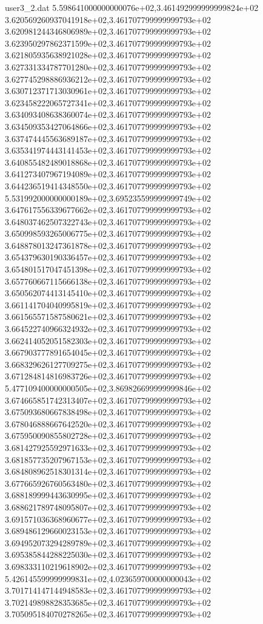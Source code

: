\begin{filecontents}{user3_2.dat}
5.598641000000000076e+02,3.461492999999999824e+02
3.620569260937041918e+02,3.461707799999999793e+02
3.620981244346806989e+02,3.461707799999999793e+02
3.623950297862371599e+02,3.461707799999999793e+02
3.621805935638921028e+02,3.461707799999999793e+02
3.627331334787701280e+02,3.461707799999999793e+02
3.627745298886936212e+02,3.461707799999999793e+02
3.630712371713030961e+02,3.461707799999999793e+02
3.623458222065727341e+02,3.461707799999999793e+02
3.634093408638360074e+02,3.461707799999999793e+02
3.634509353427064866e+02,3.461707799999999793e+02
3.637474445563689187e+02,3.461707799999999793e+02
3.635341974443141453e+02,3.461707799999999793e+02
3.640855482489018868e+02,3.461707799999999793e+02
3.641273407967194089e+02,3.461707799999999793e+02
3.644236519414348550e+02,3.461707799999999793e+02
5.531992000000000189e+02,3.695235599999999749e+02
3.647617556339677662e+02,3.461707799999999793e+02
3.648037462507322743e+02,3.461707799999999793e+02
3.650998593265006775e+02,3.461707799999999793e+02
3.648878013247361878e+02,3.461707799999999793e+02
3.654379630190336457e+02,3.461707799999999793e+02
3.654801517047451398e+02,3.461707799999999793e+02
3.657760667115666138e+02,3.461707799999999793e+02
3.650562074413145410e+02,3.461707799999999793e+02
3.661141704040995819e+02,3.461707799999999793e+02
3.661565571587580621e+02,3.461707799999999793e+02
3.664522740966324932e+02,3.461707799999999793e+02
3.662414052051582303e+02,3.461707799999999793e+02
3.667903777891654045e+02,3.461707799999999793e+02
3.668329626127709275e+02,3.461707799999999793e+02
3.671284814816983726e+02,3.461707799999999793e+02
5.477109400000000505e+02,3.869826699999999846e+02
3.674665851742313407e+02,3.461707799999999793e+02
3.675093680667838498e+02,3.461707799999999793e+02
3.678046888667642520e+02,3.461707799999999793e+02
3.675950090855802728e+02,3.461707799999999793e+02
3.681427925592971633e+02,3.461707799999999793e+02
3.681857735207967153e+02,3.461707799999999793e+02
3.684808962518301314e+02,3.461707799999999793e+02
3.677665926760563480e+02,3.461707799999999793e+02
3.688189999443630995e+02,3.461707799999999793e+02
3.688621789748095807e+02,3.461707799999999793e+02
3.691571036368960677e+02,3.461707799999999793e+02
3.689486129660023153e+02,3.461707799999999793e+02
3.694952073294289789e+02,3.461707799999999793e+02
3.695385844288225030e+02,3.461707799999999793e+02
3.698333110219618902e+02,3.461707799999999793e+02
5.426145599999999831e+02,4.023659700000000043e+02
3.701714147144948583e+02,3.461707799999999793e+02
3.702149898828353685e+02,3.461707799999999793e+02
3.705095184070278265e+02,3.461707799999999793e+02

\end{filecontents}

